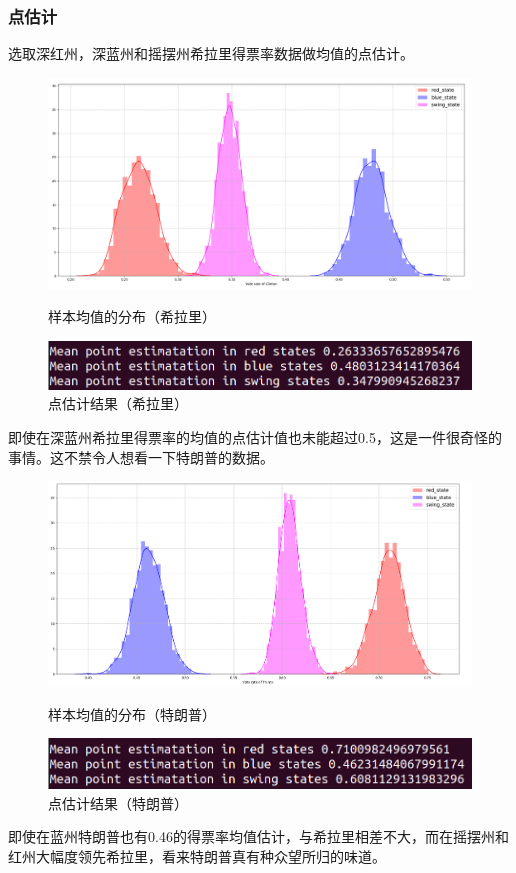 \documentclass[
12pt, %
UTF8
]{fphw}
\begin{document}
		\subsubsection{点估计}
		选取深红州，深蓝州和摇摆州希拉里得票率数据做均值的点估计。
		\begin{figure}[H]
			\centering
			\includegraphics[scale=0.45]{pnt.png}
			\caption{样本均值的分布（希拉里）}
			\includegraphics[scale=0.45]{pnt_1.png}
			\caption{点估计结果（希拉里）}
		\end{figure}
	即使在深蓝州希拉里得票率的均值的点估计值也未能超过0.5，这是一件很奇怪的事情。这不禁令人想看一下特朗普的数据。
	\begin{figure}[H]
		\centering
		\includegraphics[scale=0.45]{pnt_2.png}
		\caption{样本均值的分布（特朗普）}
		\includegraphics[scale=0.45]{pnt_3.png}
		\caption{点估计结果（特朗普）}
	\end{figure}
	即使在蓝州特朗普也有0.46的得票率均值估计，与希拉里相差不大，而在摇摆州和红州大幅度领先希拉里，看来特朗普真有种众望所归的味道。
\end{document}
